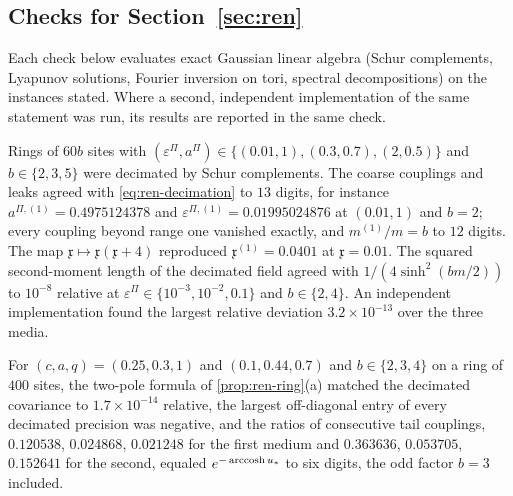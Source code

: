 \subsection{Checks for \texorpdfstring{Section~\ref{sec:ren}}{renormalization}}\label{chk:ren}

Each check below evaluates exact Gaussian linear algebra (Schur complements, Lyapunov solutions, Fourier inversion on tori, spectral decompositions) on the instances stated. Where a second, independent implementation of the same statement was run, its results are reported in the same check.

\begin{numcheck}[Decimation on $\Z$]\label{chk:ren-decimation}
Rings of $60b$ sites with $(\varepsilon^\Pi,a^\Pi)\in\{(0.01,1),(0.3,0.7),(2,0.5)\}$ and $b\in\{2,3,5\}$ were decimated by Schur complements. The coarse couplings and leaks agreed with \eqref{eq:ren-decimation} to $13$ digits, for instance $a^{\Pi,(1)}=0.4975124378$ and $\varepsilon^{\Pi,(1)}=0.01995024876$ at $(0.01,1)$ and $b=2$; every coupling beyond range one vanished exactly, and $m^{(1)}/m=b$ to $12$ digits. The map $\mathfrak x\mapsto\mathfrak x(\mathfrak x+4)$ reproduced $\mathfrak x^{(1)}=0.0401$ at $\mathfrak x=0.01$. The squared second-moment length of the decimated field agreed with $1/(4\sinh^2(bm/2))$ to $10^{-8}$ relative at $\varepsilon^\Pi\in\{10^{-3},10^{-2},0.1\}$ and $b\in\{2,4\}$. An independent implementation found the largest relative deviation $3.2\times10^{-13}$ over the three media.
\end{numcheck}

\begin{numcheck}\label{chk:ren-ring}
For $(c,a,q)=(0.25,0.3,1)$ and $(0.1,0.44,0.7)$ and $b\in\{2,3,4\}$ on a ring of $400$ sites, the two-pole formula of \cref{prop:ren-ring}(a) matched the decimated covariance to $1.7\times10^{-14}$ relative, the largest off-diagonal entry of every decimated precision was negative, and the ratios of consecutive tail couplings, $0.120538$, $0.024868$, $0.021248$ for the first medium and $0.363636$, $0.053705$, $0.152641$ for the second, equaled $e^{-\operatorname{arccosh} u_\ast}$ to six digits, the odd factor $b=3$ included.
\end{numcheck}

